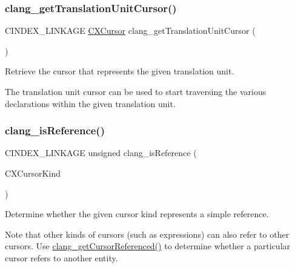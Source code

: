 \subsubsection{\texorpdfstring{clang\+\_\+get\+Translation\+Unit\+Cursor()}{clang\_getTranslationUnitCursor()}}
{\footnotesize\ttfamily C\+I\+N\+D\+E\+X\+\_\+\+L\+I\+N\+K\+A\+GE \mbox{\hyperlink{structCXCursor}{C\+X\+Cursor}} clang\+\_\+get\+Translation\+Unit\+Cursor (\begin{DoxyParamCaption}\item[{\mbox{\hyperlink{group__CINDEX_gacdb7815736ca709ce9a5e1ec2b7e16ac}{C\+X\+Translation\+Unit}}}]{ }\end{DoxyParamCaption})}



Retrieve the cursor that represents the given translation unit. 

The translation unit cursor can be used to start traversing the various declarations within the given translation unit. \mbox{\label{group__CINDEX__CURSOR__MANIP_gaf1bf500b9ada62671b53831d023387ba}} 
\subsubsection{\texorpdfstring{clang\+\_\+is\+Reference()}{clang\_isReference()}}
{\footnotesize\ttfamily C\+I\+N\+D\+E\+X\+\_\+\+L\+I\+N\+K\+A\+GE unsigned clang\+\_\+is\+Reference (\begin{DoxyParamCaption}\item[{enum}]{C\+X\+Cursor\+Kind }\end{DoxyParamCaption})}



Determine whether the given cursor kind represents a simple reference. 

Note that other kinds of cursors (such as expressions) can also refer to other cursors. Use \mbox{\hyperlink{group__CINDEX__CURSOR__XREF_gabf059155921552e19fc2abed5b4ff73a}{clang\+\_\+get\+Cursor\+Referenced()}} to determine whether a particular cursor refers to another entity. 
